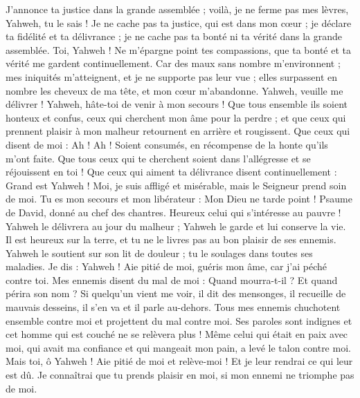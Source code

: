 \begin{multicols}{2}
J’annonce ta justice dans la grande assemblée ; voilà, je ne ferme pas mes lèvres, Yahweh, tu le sais !
Je ne cache pas ta justice, qui est dans mon cœur ; je déclare ta fidélité et ta délivrance ; je ne cache pas ta bonté ni ta vérité dans la grande assemblée.
Toi, Yahweh ! Ne m'épargne point tes compassions, que ta bonté et ta vérité me gardent continuellement.
Car des maux sans nombre m'environnent ; mes iniquités m'atteignent, et je ne supporte pas leur vue ; elles surpassent en nombre les cheveux de ma tête, et mon cœur m'abandonne.
Yahweh, veuille me délivrer ! Yahweh, hâte-toi de venir à mon secours !
Que tous ensemble ils soient honteux et confus, ceux qui cherchent mon âme pour la perdre ; et que ceux qui prennent plaisir à mon malheur retournent en arrière et rougissent.
Que ceux qui disent de moi : Ah ! Ah ! Soient consumés, en récompense de la honte qu'ils m'ont faite.
Que tous ceux qui te cherchent soient dans l’allégresse et se réjouissent en toi ! Que ceux qui aiment ta délivrance disent continuellement : Grand est Yahweh !
Moi, je suis affligé et misérable, mais le Seigneur prend soin de moi. Tu es mon secours et mon libérateur : Mon Dieu ne tarde point !
\VerseOne{}Psaume de David, donné au chef des chantres.
Heureux celui qui s’intéresse au pauvre ! Yahweh le délivrera au jour du malheur ;
Yahweh le garde et lui conserve la vie. Il est heureux sur la terre, et tu ne le livres pas au bon plaisir de ses ennemis.
Yahweh le soutient sur son lit de douleur ; tu le soulages dans toutes ses maladies.
Je dis : Yahweh ! Aie pitié de moi, guéris mon âme, car j’ai péché contre toi.
Mes ennemis disent du mal de moi : Quand mourra-t-il ? Et quand périra son nom ?
Si quelqu'un vient me voir, il dit des mensonges, il recueille de mauvais desseins, il s’en va et il parle au-dehors.
Tous mes ennemis chuchotent ensemble contre moi et projettent du mal contre moi.
Ses paroles sont indignes et cet homme qui est couché ne se relèvera plus !
Même celui qui était en paix avec moi, qui avait ma confiance et qui mangeait mon pain, a levé le talon contre moi.
Mais toi, ô Yahweh ! Aie pitié de moi et relève-moi ! Et je leur rendrai ce qui leur est dû.
Je connaîtrai que tu prends plaisir en moi, si mon ennemi ne triomphe pas de moi.

\end{multicols}
